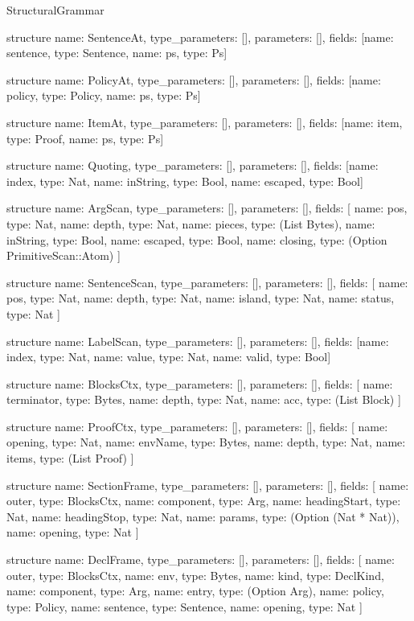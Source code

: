 \begin{lexlean}{StructuralGrammar}
\begin{semanticmodule}
structure{
  name: SentenceAt,
  type_parameters: [],
  parameters: [],
  fields: [{name: sentence, type: Sentence}, {name: ps, type: Ps}]
}

structure{
  name: PolicyAt,
  type_parameters: [],
  parameters: [],
  fields: [{name: policy, type: Policy}, {name: ps, type: Ps}]
}

structure{
  name: ItemAt,
  type_parameters: [],
  parameters: [],
  fields: [{name: item, type: Proof}, {name: ps, type: Ps}]
}

structure{
  name: Quoting,
  type_parameters: [],
  parameters: [],
  fields: [{name: index, type: Nat}, {name: inString, type: Bool}, {name: escaped, type: Bool}]
}

structure{
  name: ArgScan,
  type_parameters: [],
  parameters: [],
  fields: [
    {name: pos, type: Nat},
    {name: depth, type: Nat},
    {name: pieces, type: (List Bytes)},
    {name: inString, type: Bool},
    {name: escaped, type: Bool},
    {name: closing, type: (Option PrimitiveScan::Atom)}
  ]
}

structure{
  name: SentenceScan,
  type_parameters: [],
  parameters: [],
  fields: [
    {name: pos, type: Nat},
    {name: depth, type: Nat},
    {name: island, type: Nat},
    {name: status, type: Nat}
  ]
}

structure{
  name: LabelScan,
  type_parameters: [],
  parameters: [],
  fields: [{name: index, type: Nat}, {name: value, type: Nat}, {name: valid, type: Bool}]
}

structure{
  name: BlocksCtx,
  type_parameters: [],
  parameters: [],
  fields: [
    {name: terminator, type: Bytes},
    {name: depth, type: Nat},
    {name: acc, type: (List Block)}
  ]
}

structure{
  name: ProofCtx,
  type_parameters: [],
  parameters: [],
  fields: [
    {name: opening, type: Nat},
    {name: envName, type: Bytes},
    {name: depth, type: Nat},
    {name: items, type: (List Proof)}
  ]
}

structure{
  name: SectionFrame,
  type_parameters: [],
  parameters: [],
  fields: [
    {name: outer, type: BlocksCtx},
    {name: component, type: Arg},
    {name: headingStart, type: Nat},
    {name: headingStop, type: Nat},
    {name: params, type: (Option (Nat * Nat))},
    {name: opening, type: Nat}
  ]
}

structure{
  name: DeclFrame,
  type_parameters: [],
  parameters: [],
  fields: [
    {name: outer, type: BlocksCtx},
    {name: env, type: Bytes},
    {name: kind, type: DeclKind},
    {name: component, type: Arg},
    {name: entry, type: (Option Arg)},
    {name: policy, type: Policy},
    {name: sentence, type: Sentence},
    {name: opening, type: Nat}
  ]
}


\end{semanticmodule}
\end{lexlean}

